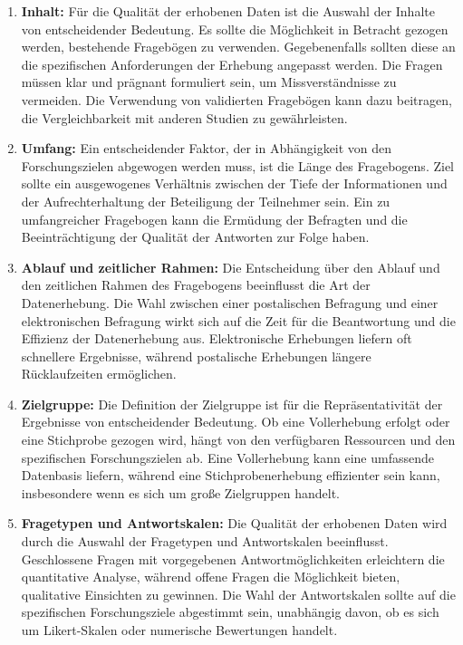 \begin{enumerate}

    \item \textbf{Inhalt:}
    Für die Qualität der erhobenen Daten ist die Auswahl der Inhalte von entscheidender Bedeutung. Es sollte die
    Möglichkeit in Betracht gezogen werden, bestehende Fragebögen zu verwenden. Gegebenenfalls sollten diese an die
    spezifischen Anforderungen der Erhebung angepasst werden. Die Fragen müssen klar und prägnant formuliert sein, um
    Missverständnisse zu vermeiden. Die Verwendung von validierten Fragebögen kann dazu beitragen, die Vergleichbarkeit
    mit anderen Studien zu gewährleisten.

    \item \textbf{Umfang:}
    Ein entscheidender Faktor, der in Abhängigkeit von den Forschungszielen abgewogen werden muss, ist die Länge des
    Fragebogens. Ziel sollte ein ausgewogenes Verhältnis zwischen der Tiefe der Informationen und der Aufrechterhaltung
    der Beteiligung der Teilnehmer sein. Ein zu umfangreicher Fragebogen kann die Ermüdung der Befragten und die
    Beeinträchtigung der Qualität der Antworten zur Folge haben.

    \item \textbf{Ablauf und zeitlicher Rahmen:}
    Die Entscheidung über den Ablauf und den zeitlichen Rahmen des Fragebogens beeinflusst die Art der Datenerhebung.
    Die Wahl zwischen einer postalischen Befragung und einer elektronischen Befragung wirkt sich auf die Zeit für die
    Beantwortung und die Effizienz der Datenerhebung aus. Elektronische Erhebungen liefern oft schnellere Ergebnisse,
    während postalische Erhebungen längere Rücklaufzeiten ermöglichen.

    \item \textbf{Zielgruppe:}
    Die Definition der Zielgruppe ist für die Repräsentativität der Ergebnisse von entscheidender Bedeutung. Ob eine
    Vollerhebung erfolgt oder eine Stichprobe gezogen wird, hängt von den verfügbaren Ressourcen und den spezifischen
    Forschungszielen ab. Eine Vollerhebung kann eine umfassende Datenbasis liefern, während eine Stichprobenerhebung
    effizienter sein kann, insbesondere wenn es sich um große Zielgruppen handelt.

    \item \textbf{Fragetypen und Antwortskalen:}
    Die Qualität der erhobenen Daten wird durch die Auswahl der Fragetypen und Antwortskalen beeinflusst. Geschlossene
    Fragen mit vorgegebenen Antwortmöglichkeiten erleichtern die quantitative Analyse, während offene Fragen die
    Möglichkeit bieten, qualitative Einsichten zu gewinnen. Die Wahl der Antwortskalen sollte auf die spezifischen
    Forschungsziele abgestimmt sein, unabhängig davon, ob es sich um Likert-Skalen oder numerische Bewertungen handelt.


\end{enumerate}
